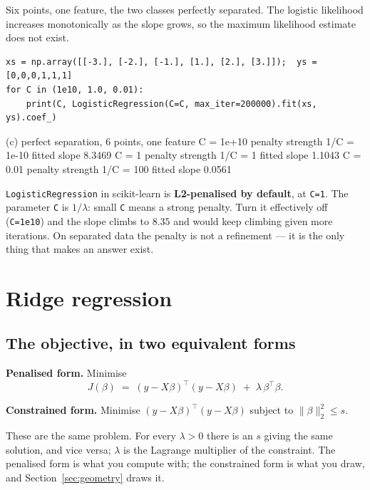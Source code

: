 \documentclass[11pt]{article}
\begin{document}
Six points, one feature, the two classes perfectly separated. The logistic
likelihood increases monotonically as the slope grows, so the maximum
likelihood estimate does not exist.

\begin{lstlisting}
xs = np.array([[-3.], [-2.], [-1.], [1.], [2.], [3.]]);  ys = [0,0,0,1,1,1]
for C in (1e10, 1.0, 0.01):
    print(C, LogisticRegression(C=C, max_iter=200000).fit(xs, ys).coef_)
\end{lstlisting}
\begin{codeout}
(c) perfect separation, 6 points, one feature
    C = 1e+10     penalty strength 1/C = 1e-10     fitted slope     8.3469
    C = 1         penalty strength 1/C = 1         fitted slope     1.1043
    C = 0.01      penalty strength 1/C = 100       fitted slope     0.0561
\end{codeout}

\begin{caution}
\texttt{LogisticRegression} in scikit-learn is \textbf{L2-penalised by
default}, at \texttt{C=1}. The parameter \texttt{C} is $1/\lambda$: small
\texttt{C} means a strong penalty. Turn it effectively off
(\texttt{C=1e10}) and the slope climbs to $8.35$ and would keep climbing given
more iterations. On separated data the penalty is not a refinement --- it is
the only thing that makes an answer exist.
\end{caution}

\section{Ridge regression}
\label{sec:ridge}

\subsection{The objective, in two equivalent forms}

\textbf{Penalised form.} Minimise
\begin{equation}
  J(\beta) \;=\; (y - X\beta)^{\!\top}(y - X\beta)
    \;+\; \lambda\,\beta^{\!\top}\beta .
  \label{eq:ridgeobj}
\end{equation}

\textbf{Constrained form.} Minimise $(y - X\beta)^{\!\top}(y - X\beta)$
subject to $\|\beta\|_2^2 \le s$.

These are the same problem. For every $\lambda > 0$ there is an $s$ giving the
same solution, and vice versa; $\lambda$ is the Lagrange multiplier of the
constraint. The penalised form is what you compute with; the constrained form
is what you draw, and Section~\ref{sec:geometry} draws it.
\end{document}

